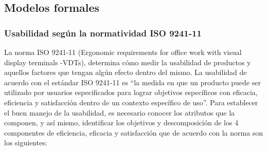 \documentclass[11pt]{article}
\begin{document}
\begin{normalsize}
\begin{flushleft}
\begin{itemize}
\begin{enumerate}
	        \end{enumerate}
	    \end{itemize}
		
		
    \subsection{Modelos formales}
        \subsubsection{Usabilidad según la normatividad ISO 9241-11}
        \begin{itemize}
            La norma ISO 9241-11 (Ergonomic requirements for office work with visual display terminals -VDTs), determina cómo medir la usabilidad de productos y aquellos factores que tengan algún efecto dentro del mismo. 
            La usabilidad de acuerdo con el estándar ISO 9241-11 es “la medida en que un producto puede ser utilizado por usuarios especificados para lograr objetivos específicos con eficacia, eficiencia y satisfacción dentro de un contexto específico de uso”. 
            Para establecer el buen manejo de la usabilidad, es necesario conocer los atributos que la componen, y así mismo, identificar los objetivos y descomposición de los 4 componentes de eficiencia, eficacia y satisfacción que de acuerdo con la norma son los siguientes:


\end{itemize}
\end{flushleft}
\end{normalsize}
\end{document}
